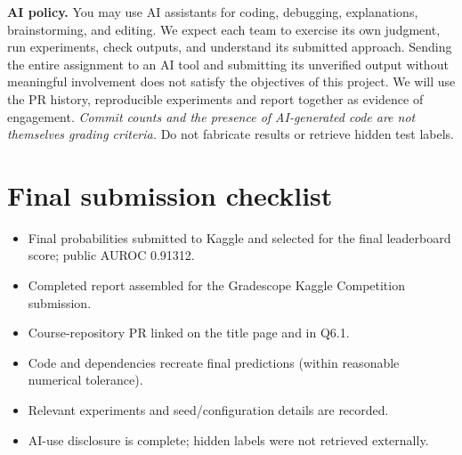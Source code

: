 \documentclass[11pt,letterpaper]{article}
\begin{document}
\textbf{AI policy.} You may use AI assistants for coding, debugging, explanations, brainstorming, and editing. We expect each team to exercise its own judgment, run experiments, check outputs, and understand its submitted approach. Sending the entire assignment to an AI tool and submitting its unverified output without meaningful involvement does not satisfy the objectives of this project. We will use the PR history, reproducible experiments and report together as evidence of engagement. \emph{Commit counts and the presence of AI-generated code are not themselves grading criteria.} Do not fabricate results or retrieve hidden test labels.


\section*{Final submission checklist}
\begin{itemize}[label=$\square$]
\item Final probabilities submitted to Kaggle and selected for the final leaderboard score; public AUROC 0.91312.
\item Completed report assembled for the Gradescope Kaggle Competition submission.
\item Course-repository PR linked on the title page and in Q6.1.
\item Code and dependencies recreate final predictions (within reasonable numerical tolerance).
\item Relevant experiments and seed/configuration details are recorded.
\item AI-use disclosure is complete; hidden labels were not retrieved externally.
\end{itemize}
\end{document}
